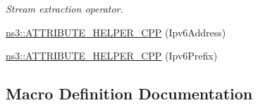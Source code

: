 \begin{DoxyCompactItemize}
\begin{DoxyCompactList}\small\item\em Stream extraction operator. \end{DoxyCompactList}\item 
\hyperlink{namespacens3_aac867971cdf8df9ac75f7c84a132f3bb}{ns3\+::\+A\+T\+T\+R\+I\+B\+U\+T\+E\+\_\+\+H\+E\+L\+P\+E\+R\+\_\+\+C\+PP} (Ipv6\+Address)
\item 
\hyperlink{namespacens3_a380ccc73ef356d875df07b5d0e430780}{ns3\+::\+A\+T\+T\+R\+I\+B\+U\+T\+E\+\_\+\+H\+E\+L\+P\+E\+R\+\_\+\+C\+PP} (Ipv6\+Prefix)
\end{DoxyCompactItemize}


\subsection{Macro Definition Documentation}

